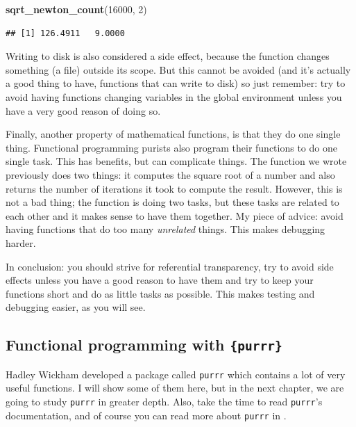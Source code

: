\documentclass[]{gitbook}
\newenvironment{Shaded}{\begin{snugshade}}{\end{snugshade}}
\newcommand{\DecValTok}[1]{\textcolor[rgb]{0.00,0.00,0.81}{#1}}
\newcommand{\KeywordTok}[1]{\textcolor[rgb]{0.13,0.29,0.53}{\textbf{#1}}}
\newcommand{\NormalTok}[1]{#1}
\theoremstyle{definition}
\theoremstyle{definition}
\theoremstyle{definition}
\theoremstyle{remark}
\begin{document}
\begin{Shaded}
\begin{Highlighting}[]
\KeywordTok{sqrt_newton_count}\NormalTok{(}\DecValTok{16000}\NormalTok{, }\DecValTok{2}\NormalTok{)}
\end{Highlighting}
\end{Shaded}

\begin{verbatim}
## [1] 126.4911   9.0000
\end{verbatim}

Writing to disk is also considered a side effect, because the function
changes something (a file) outside its scope. But this cannot be avoided
(and it's actually a good thing to have, functions that can write to
disk) so just remember: try to avoid having functions changing variables
in the global environment unless you have a very good reason of doing
so.

Finally, another property of mathematical functions, is that they do one
single thing. Functional programming purists also program their
functions to do one single task. This has benefits, but can complicate
things. The function we wrote previously does two things: it computes
the square root of a number and also returns the number of iterations it
took to compute the result. However, this is not a bad thing; the
function is doing two tasks, but these tasks are related to each other
and it makes sense to have them together. My piece of advice: avoid
having functions that do too many \emph{unrelated} things. This makes
debugging harder.

In conclusion: you should strive for referential transparency, try to
avoid side effects unless you have a good reason to have them and try to
keep your functions short and do as little tasks as possible. This makes
testing and debugging easier, as you will see.

\hypertarget{functional-programming-with-purrr}{%
\subsection{\texorpdfstring{Functional programming with
\texttt{\{purrr\}}}{Functional programming with \{purrr\}}}\label{functional-programming-with-purrr}}

Hadley Wickham developed a package called \texttt{purrr} which contains
a lot of very useful functions. I will show some of them here, but in
the next chapter, we are going to study \texttt{purrr} in greater depth.
Also, take the time to read \texttt{purrr}'s documentation, and of
course you can read more about \texttt{purrr} in \citet{wickham2016}.
\end{document}

